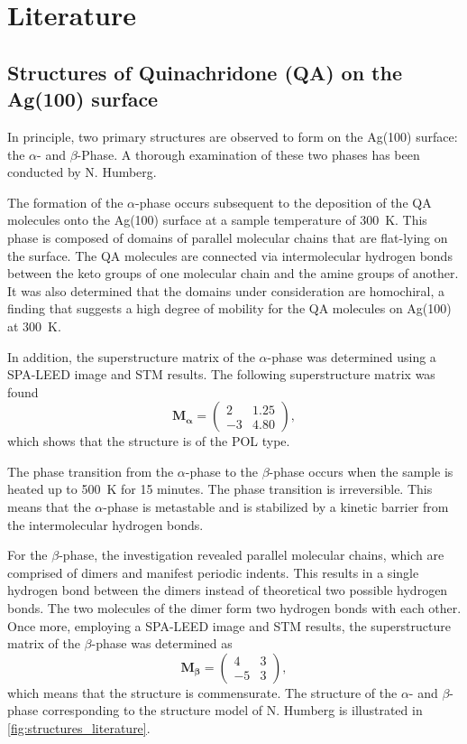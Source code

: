 \chapter{Literature}
\section{Structures of Quinachridone (QA) on the Ag(100) surface}

In principle, two primary structures are observed to form on the Ag(100) surface: the $\alpha$- and $\beta$-Phase. A thorough examination of these two phases has been conducted by N. Humberg.\autocite{Humberg2024}

The formation of the $\alpha$-phase occurs subsequent to the deposition of the \ac{QA} molecules onto the Ag(100) surface at a sample temperature of 300~\si{K}. This phase is composed of domains of parallel molecular chains that are flat-lying on the surface. The \ac{QA} molecules are connected via intermolecular hydrogen bonds between the keto groups of one molecular chain and the amine groups of another. It was also determined that the domains under consideration are homochiral, a finding that suggests a high degree of mobility for the \ac{QA} molecules on Ag(100) at 300~\si{K}.

In addition, the superstructure matrix of the $\alpha$-phase was determined using a \ac{SPA-LEED} image and \ac{STM} results. The following superstructure matrix was found
\begin{equation*}
\mathbf{M_\alpha} =\begin{pmatrix}
2 & 1.25 \\
-3 & 4.80 
\end{pmatrix},
\end{equation*}
which shows that the structure is of the \ac{POL} type.


The phase transition from the $\alpha$-phase to the $\beta$-phase occurs when the sample is heated up to 500~\si{K} for 15 minutes. The phase transition is irreversible. This means that the $\alpha$-phase is metastable and is stabilized by a kinetic barrier from the intermolecular hydrogen bonds.


For the $\beta$-phase, the investigation revealed parallel molecular chains, which are comprised of dimers and manifest periodic indents. This results in a single hydrogen bond between the dimers instead of theoretical two possible hydrogen bonds. The two molecules of the dimer form two hydrogen bonds with each other. Once more, employing a \ac{SPA-LEED} image and \ac{STM} results, the superstructure matrix of the $\beta$-phase was determined as
\begin{equation*}
\mathbf{M_\beta} =\begin{pmatrix}
4 & 3 \\
-5 & 3 
\end{pmatrix},
\end{equation*}
which means that the structure is commensurate.
The structure of the $\alpha$- and $\beta$-phase corresponding to the structure model of N. Humberg is illustrated in \autoref{fig:structures_literature}.

